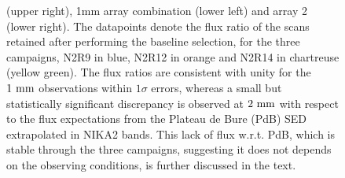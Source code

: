 \begin{figure}[ht!]
\begin{center}
{      (upper right), 1mm array combination (lower left) and array 2 (lower
      right). The datapoints denote the flux ratio of the scans
      retained after performing the
      baseline selection, for the three campaigns, N2R9
      in blue, N2R12 in orange and N2R14 in chartreuse (yellow
      green). The flux ratios are consistent with unity for the
      $1~\rm{mm}$ observations within $1\sigma$ errors, whereas a
      small but statistically significant discrepancy is observed at
      $2~\rm{mm}$ with respect to the flux expectations from the Plateau
      de Bure (PdB) SED extrapolated in NIKA2 bands. This lack of flux
      w.r.t. PdB, which is stable through the three campaigns, suggesting it
      does not depends on the observing conditions, is further
      discussed in the text.}
    \label{fig:mwc349_flux_obstau}
  \end{center}
\end{figure}



